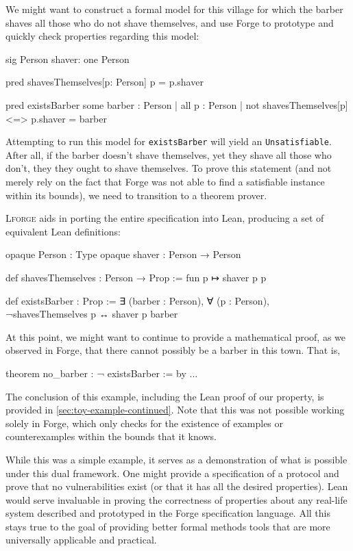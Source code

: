 We might want to construct a formal model for this village for which the barber shaves all those who do not shave themselves, and use Forge to prototype and quickly check properties regarding this model: 

\begin{forge*}
sig Person {
  shaver: one Person
}

pred shavesThemselves[p: Person] {
  p = p.shaver
}

pred existsBarber {
  some barber : Person | all p : Person | {
    not shavesThemselves[p] <=> p.shaver = barber
  }
}
\end{forge*}

Attempting to run this model for \texttt{existsBarber} will yield an \texttt{Unsatisfiable}. After all, if the barber doesn't shave themselves, yet they shave all those who don't, they they ought to shave themselves. To prove this statement (and not merely rely on the fact that Forge was not able to find a satisfiable instance within its bounds), we need to transition to a theorem prover. 

\textsc{Lforge} aids in porting the entire specification into Lean, producing a set of equivalent Lean definitions: 

\begin{lean*}
opaque Person : Type
opaque shaver : Person → Person

def shavesThemselves : Person → Prop :=
  fun p ↦ shaver p p

def existsBarber : Prop :=
  ∃ (barber : Person), ∀ (p : Person), ¬shavesThemselves p ↔ shaver p barber
\end{lean*}
At this point, we might want to continue to provide a mathematical proof, as we observed in Forge, that there cannot possibly be a barber in this town. That is, 

\begin{lean*}
theorem no_barber : ¬ existsBarber := by ...
\end{lean*}
The conclusion of this example, including the Lean proof of our property, is provided in \cref{sec:toy-example-continued}. Note that this was not possible working solely in Forge, which only checks for the existence of examples or counterexamples within the bounds that it knows. 

While this was a simple example, it serves as a demonstration of what is possible under this dual framework. One might provide a specification of a protocol and prove that no vulnerabilities exist (or that it has all the desired properties). Lean would serve invaluable in proving the correctness of properties about any real-life system described and prototyped in the Forge specification language. All this stays true to the goal of providing better formal methods tools that are more universally applicable and practical. 

